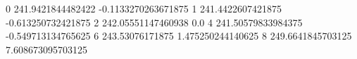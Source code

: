 0 241.9421844482422 -0.1133270263671875
1 241.4422607421875 -0.613250732421875
2 242.05551147460938 0.0
4 241.50579833984375 -0.549713134765625
6 243.53076171875 1.475250244140625
8 249.6641845703125 7.608673095703125

